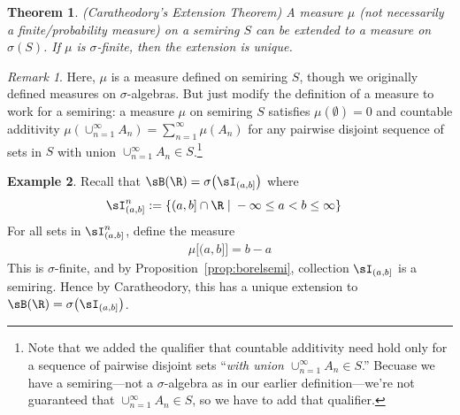 \documentclass[12pt]{article}
\theoremstyle{plain}
\newtheorem{thm}{Theorem}[section]
\newtheorem{prop}[thm]{Proposition}
\theoremstyle{definition}
\newtheorem{ex}[thm]{Example}
\theoremstyle{remark}
\newtheorem*{rmk}{Remark}
\newcommand{\sumninf}{\sum^\infty_{n=1}}
\newcommand{\ninf}{_{n=1}^\infty}
\newcommand{\limn}{\lim_{n\rightarrow\infty}}
\begin{document}

\begin{thm}\emph{(Caratheodory's Extension Theorem)}
\label{thm:cara}
A measure $\mu$ (not necessarily a finite/probability measure) on a
semiring $S$ can be extended to a measure on $\sigma(S)$. If $\mu$ is
$\sigma$-finite, then the extension is unique.
\end{thm}
\begin{rmk}
Here, $\mu$ is a measure defined on semiring $S$, though we originally
defined measures on $\sigma$-algebras. But just modify the
definition of a measure to work for a semiring:
a measure $\mu$ on semiring $S$ satisfies $\mu(\emptyset)=0$ and
countable additivity $\mu(\cup\ninf A_n) = \sumninf\mu(A_n)$
for any pairwise disjoint sequence of sets in $S$ with union $\cup\ninf
A_n\in S$.\footnote{%
  Note that we added the qualifier that countable additivity need hold
  only for a sequence of pairwise disjoint sets
  ``\emph{with union $\cup\ninf A_n\in S$}.''
  Becuase we have a semiring---not a $\sigma$-algebra as in our earlier
  definition---we're not guaranteed that $\cup\ninf A_n\in S$, so we
  have to add that qualifier.
}
\end{rmk}

\begin{ex}
Recall that $\sB(\R)=\sigma\big(\sI_{(a,b]}\big)$ where
\begin{align*}
  \sI^n_{(a,b]} &:=
  \left\{
    (a,b] \cap \R
    \;|\; -\infty\leq a < b \leq \infty
  \right\}
\end{align*}
For all sets in $\sI^n_{(a,b]}$, define the measure
\begin{align*}
  \mu\big[(a,b]\big] = b-a
\end{align*}
This is $\sigma$-finite, and by Proposition~\ref{prop:borelsemi},
collection $\sI_{(a,b]}$ is a semiring. Hence by Caratheodory, this
has a unique extension to $\sB(\R)=\sigma\big(\sI_{(a,b]}\big)$.
\end{ex}
\end{document}
